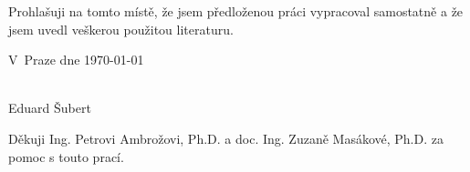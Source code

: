 \documentclass[a4paper,10pt,twoside]{article}
\theoremstyle{definition}
\theoremstyle{remark}
\begin{document}




\thispagestyle{empty}
\cleardoublepage



\vspace{0.5cm}

Prohlašuji na tomto místě, že jsem předloženou práci vypracoval samostatně 
a že jsem uvedl veškerou použitou literaturu.

\vspace{1.5cm}

\noindent
\begin{minipage}[b]{5cm}
V~Praze dne \today
\end{minipage}
\hfill
\begin{minipage}[t]{5cm}
\begin{center}
\dotfill\\
Eduard Šubert
\end{center}
\end{minipage}

\vspace*{2cm}

\vspace*{2cm}


\cleardoublepage

\thispagestyle{empty}

\begin{center}\small
Děkuji Ing. Petrovi Ambrožovi, Ph.D. a doc. Ing. Zuzaně Masákové, Ph.D. za pomoc s touto prací.
\end{center}
\end{document}

